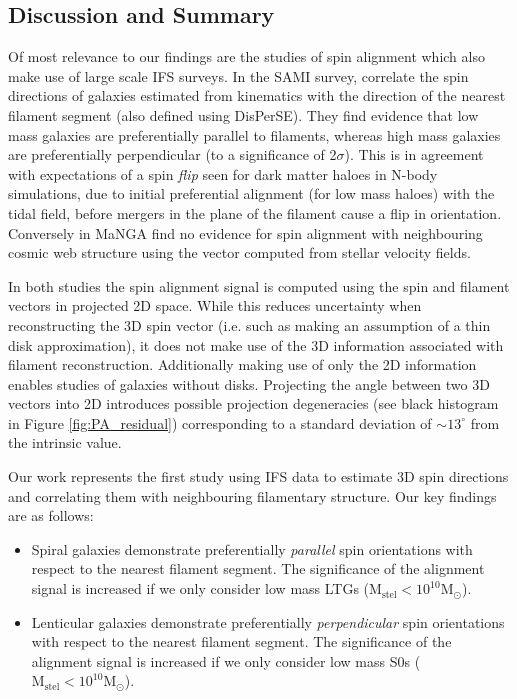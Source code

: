 \subsection{Discussion and Summary}
Of most relevance to our findings are the studies of spin alignment which also make use of large scale IFS surveys. In the SAMI survey, \citet{welker2020} correlate the spin directions of galaxies estimated from kinematics with the direction of the nearest filament segment (also defined using DisPerSE). They find evidence that low mass galaxies are preferentially parallel to filaments, whereas high mass galaxies are preferentially perpendicular (to a significance of 2$\sigma$). This is in agreement with expectations of a spin \textit{flip} seen for dark matter haloes in N-body simulations, due to initial preferential alignment (for low mass haloes) with the tidal field, before mergers in the plane of the filament cause a flip in orientation. Conversely in MaNGA \citet{krolewski2019} find no evidence for spin alignment with neighbouring cosmic web structure using the vector computed from stellar velocity fields. 

In both studies the spin alignment signal is computed using the spin and filament vectors in projected 2D space. While this reduces uncertainty when reconstructing the 3D spin vector (i.e. such as making an assumption of a thin disk approximation), it does not make use of the 3D information associated with filament reconstruction. Additionally making use of only the 2D information enables studies of galaxies without disks. Projecting the angle between two 3D vectors into 2D introduces possible projection degeneracies (see black histogram in Figure \ref{fig:PA_residual}) corresponding to a standard deviation of $\sim 13^{\circ}$ from the intrinsic value.

Our work represents the first study using IFS data to estimate 3D spin directions and correlating them with neighbouring filamentary structure. Our key findings are as follows: 
\begin{itemize}
    \item Spiral galaxies demonstrate preferentially \textit{parallel} spin orientations with respect to the nearest filament segment. The significance of the alignment signal is increased if we only consider low mass LTGs ($\mathrm{M_{stel} < 10^{10} M_{\odot}}$). 
    \item Lenticular galaxies demonstrate preferentially \textit{perpendicular} spin orientations with respect to the nearest filament segment. The significance of the alignment signal is increased if we only consider low mass S0s ($\mathrm{M_{stel} < 10^{10} M_{\odot}}$). 
\end{itemize}

